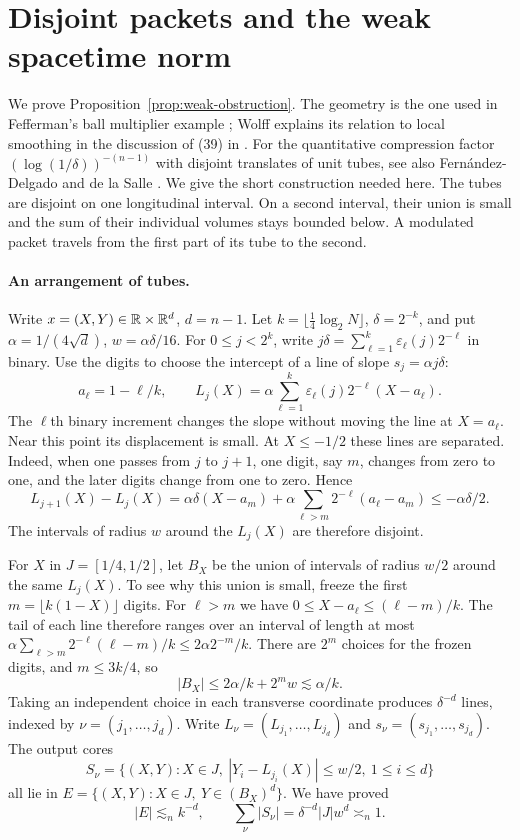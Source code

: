 \section{Disjoint packets and the weak spacetime norm}\label{sec:weak}

We prove Proposition~\ref{prop:weak-obstruction}. The geometry is the
one used in Fefferman's ball multiplier example \cite{Fefferman1971};
Wolff explains its relation to local smoothing in the discussion of
(39) in \cite{Wolff1999Kakeya}. For the quantitative compression
factor $(\log(1/\delta))^{-(n-1)}$ with disjoint translates of unit
tubes, see also Fern\'andez-Delgado and de la Salle
\cite[Theorem~1.4]{FernandezDelgadoDeLaSalle2026}. We give the short
construction needed here. The tubes are disjoint on one longitudinal
interval. On a second interval, their union is small and the sum of
their individual volumes stays bounded below. A modulated packet travels from the
first part of its tube to the second.

\paragraph{An arrangement of tubes.}
Write $x=(X,Y)\in\mathbb R\times\mathbb R^d$, $d=n-1$. Let
$k=\lfloor\frac14\log_2 N\rfloor$, $\delta=2^{-k}$, and put
$\alpha=1/(4\sqrt d)$, $w=\alpha\delta/16$. For
$0\le j<2^k$, write $j\delta=\sum_{\ell=1}^k\varepsilon_\ell(j)2^{-\ell}$
in binary. Use the digits to choose the intercept of a line of slope
$s_j=\alpha j\delta$:
\[
 a_\ell=1-\ell/k,\qquad
 L_j(X)=\alpha\sum_{\ell=1}^k\varepsilon_\ell(j)2^{-\ell}(X-a_\ell).
\]
The $\ell$th binary increment changes the slope without moving the
line at $X=a_\ell$. Near this point its displacement is small.
At $X\le-1/2$ these lines are separated. Indeed, when one passes from
$j$ to $j+1$, one digit, say $m$, changes from zero to one, and the
later digits change from one to zero. Hence
\[
 L_{j+1}(X)-L_j(X)
  =\alpha\delta(X-a_m)
       +\alpha\sum_{\ell>m}2^{-\ell}(a_\ell-a_m)
  \le-\alpha\delta/2 .
\]
The intervals of radius $w$ around the $L_j(X)$ are therefore disjoint.

For $X$ in $J=[1/4,1/2]$, let $B_X$ be the union of intervals of
radius $w/2$ around the same $L_j(X)$. To see why this union is small,
freeze the first $m=\lfloor k(1-X)\rfloor$ digits. For $\ell>m$ we
have $0\le X-a_\ell\le(\ell-m)/k$. The tail of each line therefore
ranges over an interval of length at most
$\alpha\sum_{\ell>m}2^{-\ell}(\ell-m)/k\le2\alpha 2^{-m}/k$.
There are $2^m$ choices for the frozen digits, and $m\le3k/4$, so
\[
 |B_X|\le 2\alpha/k+2^m w\lesssim\alpha/k.
\]
Taking an independent choice in each transverse coordinate produces
$\delta^{-d}$ lines, indexed by $\nu=(j_1,\ldots,j_d)$. Write
$L_\nu=(L_{j_1},\ldots,L_{j_d})$ and $s_\nu=(s_{j_1},\ldots,s_{j_d})$.
The output cores
\[
 S_\nu=\{(X,Y):X\in J,\ |Y_i-L_{j_i}(X)|\le w/2,\ 1\le i\le d\}
\]
all lie in $E=\{(X,Y):X\in J,\ Y\in (B_X)^d\}$. We have proved
\begin{equation}\label{eq:weak-geometry}
 |E|\lesssim_n k^{-d},\qquad
 \sum_\nu |S_\nu|=\delta^{-d}|J|w^d\asymp_n1.
\end{equation}

